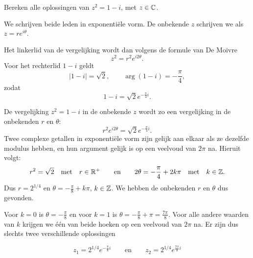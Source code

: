 \documentclass{ximera}
\begin{document}
\begin{exercise}[Vierkantswortels]
Bereken alle oplossingen van $z^2 = 1 - i$, met $z\in \mathbb{C}$.
\begin{oplossing}
We schrijven beide leden in exponentiële vorm. De onbekende $z$ schrijven we als $z = r e^{i \theta}$.

Het linkerlid van de vergelijking wordt dan volgens de formule van De Moivre
$$z^2 = r^2 e^{i 2 \theta}.$$ 
Voor het rechterlid $1-i$ geldt
\[ |1-i| = \sqrt{2}, \qquad \arg (1-i) = - \frac{\pi}{4}, \]
zodat
\[ 1-i = \sqrt{2} e^{-\frac{\pi}{4} i}. \]


De vergelijking $z^2 = 1-i$ in de onbekende $z$ wordt zo een vergelijking in de onbekenden $r$ en $\theta$:
$$r^2 e^{i 2 \theta} = \sqrt{2} e^{-\frac{\pi}{4} i}.$$ 
Twee complexe getallen in exponentiële vorm zijn gelijk aan elkaar als ze dezelfde modulus hebben, en hun argument gelijk is op een veelvoud van $2 \pi$ na. Hieruit volgt:
\[ 
r^2 = \sqrt{2} \quad \text{met} \quad r \in \mathbb{R}^+ \qquad \text{en} \qquad 2 \theta = - \frac{\pi}{4} + 2 k \pi \quad \text{met} \quad k \in \mathbb{Z}. 
\]
Dus $r= 2^{1/4}$ en $\theta = - \frac{\pi}{8} + k \pi$, $k \in \mathbb{Z}$. We hebben de onbekenden $r$ en $\theta$ dus gevonden.

Voor $k=0$ is
$\theta = - \frac{\pi}{8}$ en voor $k=1$ is $\theta = -
\frac{\pi}{8} + \pi = \frac{7\pi}{8}$. Voor alle andere waarden van $k$ krijgen we één van beide hoeken op een veelvoud van $2 \pi$ na. Er zijn dus slechts twee verschillende oplossingen 

\[ 
    z_1 = 2^{1/4} e^{-\frac{\pi}{8} i} 
\qquad \text{en} \qquad
    z_2 = 2^{1/4} e^{\frac{7\pi}{8} i}  
\]
\end{oplossing}
\end{exercise}
\end{document}
